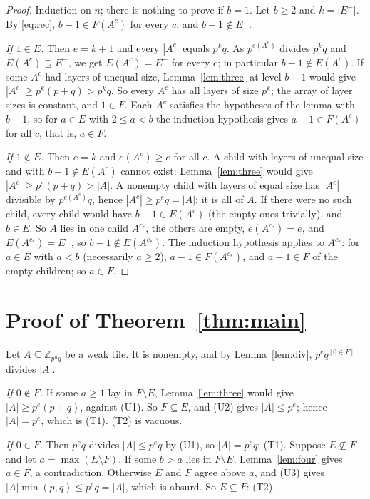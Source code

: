 \documentclass[11pt,a4paper]{amsart}
\theoremstyle{definition}
\theoremstyle{remark}
\newcommand{\Z}{\mathbb{Z}}
\begin{document}
\begin{proof}
Induction on $n$; there is nothing to prove if $b=1$. Let $b\ge2$ and $k=|E^-|$. By \eqref{eq:rec},
$b-1\in F(A^c)$ for every $c$, and $b-1\notin E^-$.

\emph{If $1\in E$.} Then $e=k+1$ and every $|A^c|$ equals $p^kq$. As $p^{e(A^c)}$ divides $p^kq$ and
$E(A^c)\supseteq E^-$, we get $E(A^c)=E^-$ for every $c$; in particular $b-1\notin E(A^c)$. If some $A^c$ had
layers of unequal size, Lemma~\ref{lem:three} at level $b-1$ would give $|A^c|\ge p^k(p+q)>p^kq$. So every
$A^c$ has all layers of size $p^k$; the array of layer sizes is constant, and $1\in F$. Each $A^c$ satisfies
the hypotheses of the lemma with $b-1$, so for $a\in E$ with $2\le a<b$ the induction hypothesis gives
$a-1\in F(A^c)$ for all $c$, that is, $a\in F$.

\emph{If $1\notin E$.} Then $e=k$ and $e(A^c)\ge e$ for all $c$. A child with layers of unequal size and with
$b-1\notin E(A^c)$ cannot exist: Lemma~\ref{lem:three} would give $|A^c|\ge p^e(p+q)>|A|$. A nonempty child
with layers of equal size has $|A^c|$ divisible by $p^{e(A^c)}q$, hence $|A^c|\ge p^eq=|A|$: it is all of $A$.
If there were no such child, every child would have $b-1\in E(A^c)$ (the empty ones trivially), and $b\in E$.
So $A$ lies in one child $A^{c_*}$, the others are empty, $e(A^{c_*})=e$, and
$E(A^{c_*})=E^-$, so $b-1\notin E(A^{c_*})$. The induction hypothesis applies to $A^{c_*}$: for $a\in E$ with
$a<b$ (necessarily $a\ge2$), $a-1\in F(A^{c_*})$, and $a-1\in F$ of the empty children; so $a\in F$.
\end{proof}

\section{Proof of Theorem~\ref{thm:main}}\label{sec:proof}

Let $A\subseteq\Z_{p^nq}$ be a weak tile. It is nonempty, and by Lemma~\ref{lem:div}, $p^eq^{[0\in F]}$
divides $|A|$.

\emph{If $0\notin F$.} If some $a\ge1$ lay in $F\setminus E$, Lemma~\ref{lem:three} would give
$|A|\ge p^e(p+q)$, against (U1). So $F\subseteq E$, and (U2) gives $|A|\le p^e$; hence $|A|=p^e$, which is
(T1). (T2) is vacuous.

\emph{If $0\in F$.} Then $p^eq$ divides $|A|\le p^eq$ by (U1), so $|A|=p^eq$: (T1). Suppose
$E\not\subseteq F$ and let $a=\max(E\setminus F)$. If some $b>a$ lies in $F\setminus E$,
Lemma~\ref{lem:four} gives $a\in F$, a contradiction. Otherwise $E$ and $F$ agree above $a$, and (U3) gives
$|A|\min(p,q)\le p^eq=|A|$, which is absurd. So $E\subseteq F$: (T2).
\end{document}
